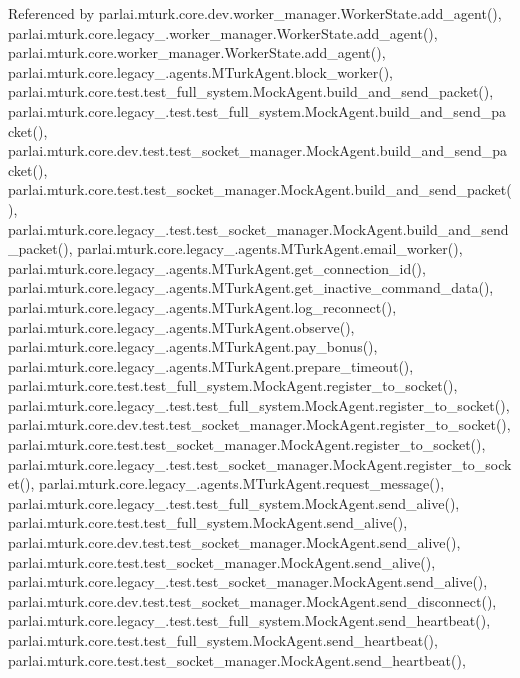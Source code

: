 Referenced by parlai.\+mturk.\+core.\+dev.\+worker\+\_\+manager.\+Worker\+State.\+add\+\_\+agent(), parlai.\+mturk.\+core.\+legacy\+\_.\+worker\+\_\+manager.\+Worker\+State.\+add\+\_\+agent(), parlai.\+mturk.\+core.\+worker\+\_\+manager.\+Worker\+State.\+add\+\_\+agent(), parlai.\+mturk.\+core.\+legacy\+\_.\+agents.\+M\+Turk\+Agent.\+block\+\_\+worker(), parlai.\+mturk.\+core.\+test.\+test\+\_\+full\+\_\+system.\+Mock\+Agent.\+build\+\_\+and\+\_\+send\+\_\+packet(), parlai.\+mturk.\+core.\+legacy\+\_.\+test.\+test\+\_\+full\+\_\+system.\+Mock\+Agent.\+build\+\_\+and\+\_\+send\+\_\+packet(), parlai.\+mturk.\+core.\+dev.\+test.\+test\+\_\+socket\+\_\+manager.\+Mock\+Agent.\+build\+\_\+and\+\_\+send\+\_\+packet(), parlai.\+mturk.\+core.\+test.\+test\+\_\+socket\+\_\+manager.\+Mock\+Agent.\+build\+\_\+and\+\_\+send\+\_\+packet(), parlai.\+mturk.\+core.\+legacy\+\_.\+test.\+test\+\_\+socket\+\_\+manager.\+Mock\+Agent.\+build\+\_\+and\+\_\+send\+\_\+packet(), parlai.\+mturk.\+core.\+legacy\+\_.\+agents.\+M\+Turk\+Agent.\+email\+\_\+worker(), parlai.\+mturk.\+core.\+legacy\+\_.\+agents.\+M\+Turk\+Agent.\+get\+\_\+connection\+\_\+id(), parlai.\+mturk.\+core.\+legacy\+\_.\+agents.\+M\+Turk\+Agent.\+get\+\_\+inactive\+\_\+command\+\_\+data(), parlai.\+mturk.\+core.\+legacy\+\_.\+agents.\+M\+Turk\+Agent.\+log\+\_\+reconnect(), parlai.\+mturk.\+core.\+legacy\+\_.\+agents.\+M\+Turk\+Agent.\+observe(), parlai.\+mturk.\+core.\+legacy\+\_.\+agents.\+M\+Turk\+Agent.\+pay\+\_\+bonus(), parlai.\+mturk.\+core.\+legacy\+\_.\+agents.\+M\+Turk\+Agent.\+prepare\+\_\+timeout(), parlai.\+mturk.\+core.\+test.\+test\+\_\+full\+\_\+system.\+Mock\+Agent.\+register\+\_\+to\+\_\+socket(), parlai.\+mturk.\+core.\+legacy\+\_.\+test.\+test\+\_\+full\+\_\+system.\+Mock\+Agent.\+register\+\_\+to\+\_\+socket(), parlai.\+mturk.\+core.\+dev.\+test.\+test\+\_\+socket\+\_\+manager.\+Mock\+Agent.\+register\+\_\+to\+\_\+socket(), parlai.\+mturk.\+core.\+test.\+test\+\_\+socket\+\_\+manager.\+Mock\+Agent.\+register\+\_\+to\+\_\+socket(), parlai.\+mturk.\+core.\+legacy\+\_.\+test.\+test\+\_\+socket\+\_\+manager.\+Mock\+Agent.\+register\+\_\+to\+\_\+socket(), parlai.\+mturk.\+core.\+legacy\+\_.\+agents.\+M\+Turk\+Agent.\+request\+\_\+message(), parlai.\+mturk.\+core.\+legacy\+\_.\+test.\+test\+\_\+full\+\_\+system.\+Mock\+Agent.\+send\+\_\+alive(), parlai.\+mturk.\+core.\+test.\+test\+\_\+full\+\_\+system.\+Mock\+Agent.\+send\+\_\+alive(), parlai.\+mturk.\+core.\+dev.\+test.\+test\+\_\+socket\+\_\+manager.\+Mock\+Agent.\+send\+\_\+alive(), parlai.\+mturk.\+core.\+test.\+test\+\_\+socket\+\_\+manager.\+Mock\+Agent.\+send\+\_\+alive(), parlai.\+mturk.\+core.\+legacy\+\_.\+test.\+test\+\_\+socket\+\_\+manager.\+Mock\+Agent.\+send\+\_\+alive(), parlai.\+mturk.\+core.\+dev.\+test.\+test\+\_\+socket\+\_\+manager.\+Mock\+Agent.\+send\+\_\+disconnect(), parlai.\+mturk.\+core.\+legacy\+\_.\+test.\+test\+\_\+full\+\_\+system.\+Mock\+Agent.\+send\+\_\+heartbeat(), parlai.\+mturk.\+core.\+test.\+test\+\_\+full\+\_\+system.\+Mock\+Agent.\+send\+\_\+heartbeat(), parlai.\+mturk.\+core.\+test.\+test\+\_\+socket\+\_\+manager.\+Mock\+Agent.\+send\+\_\+heartbeat(), 
